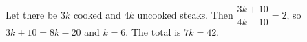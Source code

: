 Let there be $3k$ cooked and $4k$ uncooked steaks. Then $\dfrac{3k+10}{4k-10}=2$, so $3k+10=8k-20$ and $k=6$. The total is $7k=\boxed{42}$.

